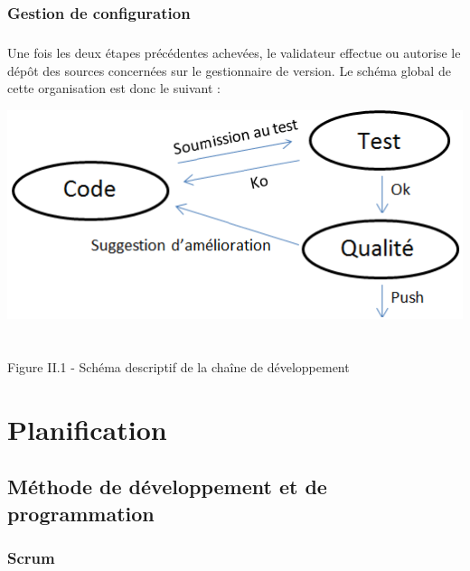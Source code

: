 \documentclass{report}
\begin{document}
\subsection{Gestion de configuration}

\paragraph{}
\hspace{4mm}\textnormal{Une fois les deux \'{e}tapes pr\'{e}c\'{e}dentes achev\'{e}es, le validateur effectue ou autorise le d\'{e}p\^{o}t des sources concern\'{e}es
sur le gestionnaire de version. Le sch\'{e}ma global de cette organisation est donc le suivant :}

\begin{center}
\includegraphics[scale=0.7]{data/cycle_qualite}
~\\~\\Figure II.1 - Sch\'{e}ma descriptif de la cha\^{i}ne de d\'{e}veloppement
\end{center}

\chapter{Planification}

\section{M\'{e}thode de d\'{e}veloppement et de programmation}

\subsection{Scrum}
\end{document}
